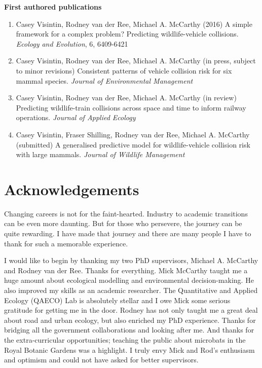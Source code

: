 \documentclass[titlesmallcaps,copyrightpage,examinerscopy]{uomthesis}
\begin{document}
\newpage
\textbf{First authored publications}
\begin{enumerate}
\item Casey Visintin, Rodney van der Ree, Michael A. McCarthy (2016) A simple framework for a complex problem?  Predicting wildlife-vehicle collisions. \textit{Ecology and Evolution}, 6, 6409-6421

\item Casey Visintin, Rodney van der Ree, Michael A. McCarthy (in press, subject to minor revisions) Consistent patterns of vehicle collision risk for six mammal species. \textit{Journal of Environmental Management}

\item Casey Visintin, Rodney van der Ree, Michael A. McCarthy (in review) Predicting wildlife-train collisions across space and time to inform railway operations. \textit{Journal of Applied Ecology}

\item Casey Visintin, Fraser Shilling, Rodney van der Ree, Michael A. McCarthy (submitted) A generalised predictive model for wildlife-vehicle collision risk with large mammals. \textit{Journal of Wildlife Management}
\end{enumerate}
\clearpage{\pagestyle{empty}\cleardoublepage}

\chapter{Acknowledgements}

Changing careers is not for the faint-hearted. Industry to academic transitions can be even more daunting. But for those who persevere, the journey can be quite rewarding. I have made that journey and there are many people I have to thank for such a memorable experience.

I would like to begin by thanking my two PhD supervisors, Michael A. McCarthy and Rodney van der Ree. Thanks for everything. Mick McCarthy taught me a huge amount about ecological modelling and environmental decision-making. He also improved my skills as an academic researcher. The Quantitative and Applied Ecology (QAECO) Lab is absolutely stellar and I owe Mick some serious gratitude for getting me in the door.  Rodney has not only taught me a great deal about road and urban ecology, but also enriched my PhD experience. Thanks for bridging all the government collaborations and looking after me. And thanks for the extra-curricular opportunities; teaching the public about microbats in the Royal Botanic Gardens was a highlight. I truly envy Mick and Rod's enthusiasm and optimism and could not have asked for better supervisors.
\end{document}
